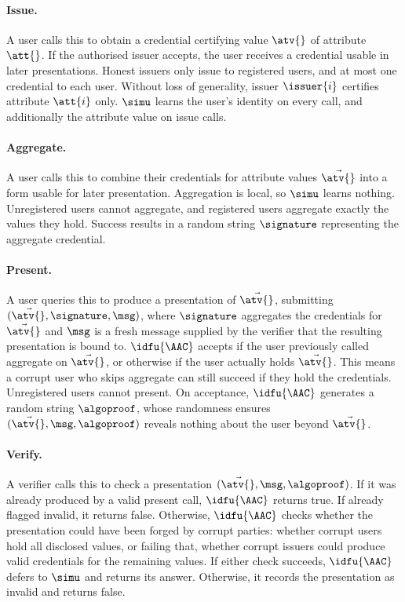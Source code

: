 \paragraph{Issue.} A user calls this to obtain a credential certifying value
$\atv{}$ of attribute $\att{}$. If the authorised issuer accepts, the user
receives a credential usable in later presentations. Honest issuers only
issue to registered users, and at most one credential to each user. Without loss
of generality, issuer $\issuer{i}$ certifies attribute $\att{i}$ only. $\simu$ learns the user's identity on
every call, and additionally the attribute value on issue calls.

\paragraph{Aggregate.} A user calls this to combine their credentials for
attribute values $\vec{\atv{}}$ into a form usable for later presentation.
Aggregation is local, so $\simu$ learns nothing. Unregistered users cannot
aggregate, and registered users aggregate exactly the values they hold. Success
results in a random string $\signature$ representing the aggregate credential.

\paragraph{Present.} A user queries this to produce a presentation of
$\vec{\atv{}}$, submitting $(\vec{\atv{}}, \signature, \msg)$, where
$\signature$ aggregates the credentials for $\vec{\atv{}}$ and $\msg$ is a fresh
message supplied by the verifier that the resulting presentation is bound to.
$\idfu{\AAC}$ accepts if the user previously called aggregate on $\vec{\atv{}}$,
or otherwise if the user actually holds $\vec{\atv{}}$. This means a corrupt
user who skips aggregate can still succeed if they hold the credentials.
Unregistered users cannot present. On
acceptance, $\idfu{\AAC}$ generates a random string $\algoproof$, whose
randomness ensures $(\vec{\atv{}}, \msg, \algoproof)$ reveals nothing about the
user beyond $\vec{\atv{}}$.

\paragraph{Verify.} A verifier calls this to check a presentation
$(\vec{\atv{}}, \msg, \algoproof)$. If it was already produced by a valid
present call, $\idfu{\AAC}$ returns true. If already flagged invalid, it returns
false.  Otherwise, $\idfu{\AAC}$ checks whether the presentation could have been
forged by corrupt parties: whether corrupt users hold all disclosed values, or
failing that, whether corrupt issuers could produce valid credentials for the
remaining values. If either check succeeds, $\idfu{\AAC}$ defers to $\simu$ and
returns its answer. Otherwise, it records the presentation as invalid and
returns false.

